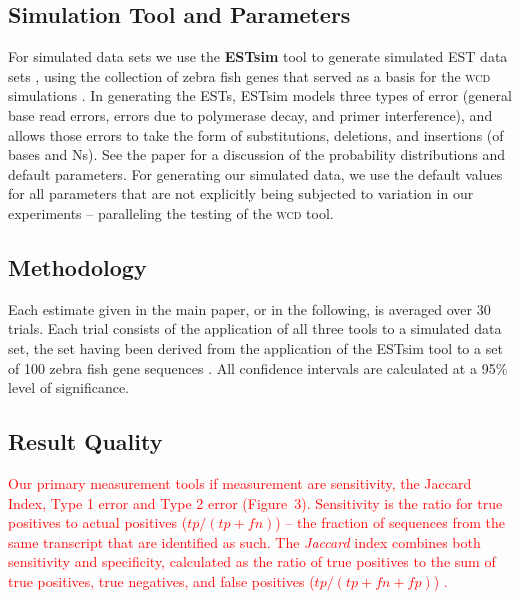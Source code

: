 \documentclass[a4paper,12pt]{article}
\newcommand{\mc}[1]{\textcolor{red}{#1}}
\begin{document}
\begin{appendix}
\subsection{Simulation Tool and Parameters}

For simulated data sets we use the {\bf ESTsim} tool to generate
simulated EST data sets \cite{Hazelhurst03}, using the collection of
zebra fish genes that served as a basis for the \textsc{wcd} simulations
\cite{Hazelhurst08a}.  In generating the ESTs, ESTsim models three
types of error (general base read errors, errors due to
polymerase decay, and primer interference), and allows those errors to
take the form of substitutions, deletions, and insertions (of bases
and Ns).  See the paper for a discussion of the probability
distributions and default parameters.  For generating our simulated
data, we use the default values for all parameters that are not
explicitly being subjected to variation in our experiments --
paralleling the testing of the \textsc{wcd} tool.



\subsection{Methodology} 

Each estimate given in the main paper, or in the following, is
averaged over 30 trials.  Each trial consists of the application of
all three tools to a simulated data set, the set having been derived
from the application of the ESTsim tool to a set of 100 zebra fish
gene sequences \cite{Hazelhurst03}.  All confidence intervals are
calculated at a 95\% level of significance.

\subsection{Result Quality}

\mc{Our primary measurement tools if measurement are sensitivity, the
Jaccard Index, Type 1 error and Type 2 error
(Figure~3).  Sensitivity is the ratio for true
positives to actual positives ($tp / (tp + fn)$) -- the} \mc{fraction} \mc{of}
\mc{sequences} \mc{from} \mc{the} \mc{same} \mc{transcript} \mc{that} \mc{are} \mc{identified} \mc{as} \mc{such.}  \mc{The}
\mc{{\it Jaccard}} \mc{index} \mc{combines} \mc{both} \mc{sensitivity} \mc{and} \mc{specificity,}
\mc{calculated} \mc{as} \mc{the} \mc{ratio} \mc{of} \mc{true} \mc{positives} \mc{to} \mc{the sum of true
positives, true negatives, and false positives ($tp / (tp+fn+fp)$)
\cite{Hazelhurst08a}.}


\end{appendix}
\end{document}
